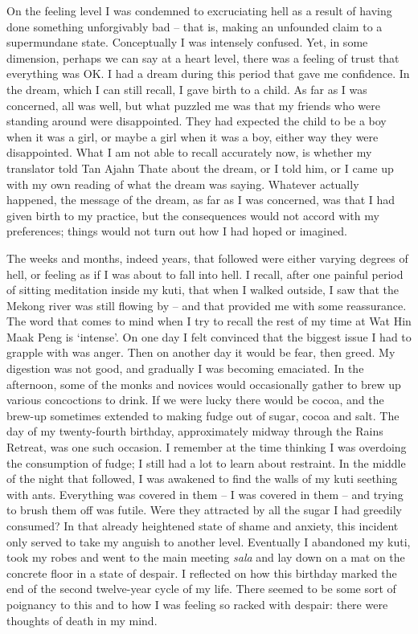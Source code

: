 On the feeling level I was condemned to excruciating hell as a result of
having done something unforgivably bad -- that is, making an unfounded
claim to a supermundane state. Conceptually I was intensely confused.
Yet, in some dimension, perhaps we can say at a heart level, there was a
feeling of trust that everything was OK. I had a dream during this
period that gave me confidence. In the dream, which I can still recall,
I gave birth to a child. As far as I was concerned, all was well, but
what puzzled me was that my friends who were standing around were
disappointed. They had expected the child to be a boy when it was a
girl, or maybe a girl when it was a boy, either way they were
disappointed. What I am not able to recall accurately now, is whether my
translator told Tan Ajahn Thate about the dream, or I told him, or I
came up with my own reading of what the dream was saying. Whatever
actually happened, the message of the dream, as far as I was concerned,
was that I had given birth to my practice, but the consequences would
not accord with my preferences; things would not turn out how I had
hoped or imagined.

The weeks and months, indeed years, that followed were either varying
degrees of hell, or feeling as if I was about to fall into hell. I
recall, after one painful period of sitting meditation inside my kuti,
that when I walked outside, I saw that the Mekong river was still
flowing by -- and that provided me with some reassurance. The word that
comes to mind when I try to recall the rest of my time at Wat Hin Maak
Peng is `intense'. On one day I felt convinced that the biggest issue I
had to grapple with was anger. Then on another day it would be fear,
then greed. My digestion was not good, and gradually I was becoming
emaciated. In the afternoon, some of the monks and novices would
occasionally gather to brew up various concoctions to drink. If we were
lucky there would be cocoa, and the brew-up sometimes extended to making
fudge out of sugar, cocoa and salt. The day of my twenty-fourth
birthday, approximately midway through the Rains Retreat, was one such
occasion. I remember at the time thinking I was overdoing the
consumption of fudge; I still had a lot to learn about restraint. In the
middle of the night that followed, I was awakened to find the walls of
my kuti seething with ants. Everything was covered in them -- I was
covered in them -- and trying to brush them off was futile. Were they
attracted by all the sugar I had greedily consumed? In that already
heightened state of shame and anxiety, this incident only served to take
my anguish to another level. Eventually I abandoned my kuti, took my
robes and went to the main meeting \emph{sala} and lay down on a mat on
the concrete floor in a state of despair. I reflected on how this
birthday marked the end of the second twelve-year cycle of my life.
There seemed to be some sort of poignancy to this and to how I was
feeling so racked with despair: there were thoughts of death in my mind.

